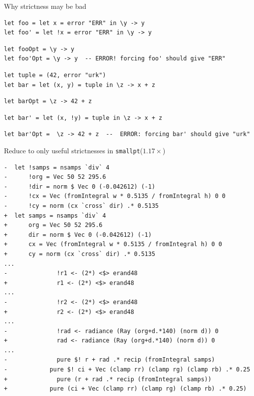 \documentclass[8pt]{beamer}
\begin{document}

\begin{frame}[fragile]{Why strictness may be bad}
\begin{verbatim}
let foo = let x = error "ERR" in \y -> y
let foo' = let !x = error "ERR" in \y -> y
\end{verbatim}
\pause
\begin{verbatim}
let fooOpt = \y -> y
let foo'Opt = \y -> y  -- ERROR! forcing foo' should give "ERR"
\end{verbatim}
\pause
\begin{verbatim}
let tuple = (42, error "urk")
let bar = let (x, y) = tuple in \z -> x + z
\end{verbatim}
\pause
\begin{verbatim}
let barOpt = \z -> 42 + z
\end{verbatim}
\pause
\begin{verbatim}
let bar' = let (x, !y) = tuple in \z -> x + z
\end{verbatim}
\pause
\begin{verbatim}
let bar'Opt =  \z -> 42 + z  --  ERROR: forcing bar' should give "urk"
\end{verbatim}
\end{frame}


\begin{frame}[fragile]{Reduce to only useful strictnesses in \texttt{smallpt}($1.17\times$)}
\begin{verbatim}
-  let !samps = nsamps `div` 4
-      !org = Vec 50 52 295.6
-      !dir = norm $ Vec 0 (-0.042612) (-1)
-      !cx = Vec (fromIntegral w * 0.5135 / fromIntegral h) 0 0
-      !cy = norm (cx `cross` dir) .* 0.5135
+  let samps = nsamps `div` 4
+      org = Vec 50 52 295.6
+      dir = norm $ Vec 0 (-0.042612) (-1)
+      cx = Vec (fromIntegral w * 0.5135 / fromIntegral h) 0 0
+      cy = norm (cx `cross` dir) .* 0.5135
...
-              !r1 <- (2*) <$> erand48
+              r1 <- (2*) <$> erand48
...
-              !r2 <- (2*) <$> erand48
+              r2 <- (2*) <$> erand48
...
-              !rad <- radiance (Ray (org+d.*140) (norm d)) 0
+              rad <- radiance (Ray (org+d.*140) (norm d)) 0
...
-              pure $! r + rad .* recip (fromIntegral samps)
-            pure $! ci + Vec (clamp rr) (clamp rg) (clamp rb) .* 0.25
+              pure (r + rad .* recip (fromIntegral samps))
+            pure (ci + Vec (clamp rr) (clamp rg) (clamp rb) .* 0.25)
\end{verbatim}
\end{frame}
\end{document}
